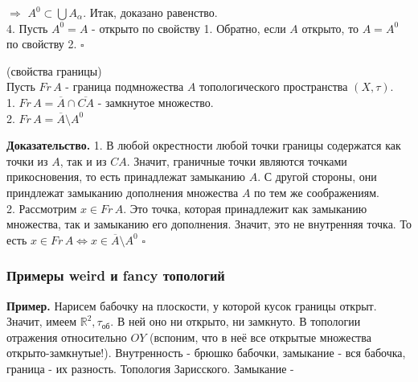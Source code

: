 $\Rightarrow$ $A^0\subset \bigcup A_\alpha$. Итак, доказано равенство.\\
4. Пусть $A^0=A$ - открыто по свойству 1. Обратно, если  $A$ открыто, то
 $A=A^0$ по свойству 2. 
$\square$ 
\begin{theor}
    (свойства границы)\\
Пусть $Fr\, A$ - граница подмножества $A$ топологического пространства 
$(X,\tau)$.\\
1. $Fr\,A=\overline{A}\cap\overline{CA}$ - замкнутое множество.\\
2. $Fr\,A=\overline{A}\setminus A^0$
\end{theor}
\textbf{Доказательство.} 
1. В любой окрестности любой точки границы содержатся как точки из $A$, так
и из  $CA$. Значит, граничные точки являются точками прикосновения, то 
есть принадлежат замыканию  $A$. С другой стороны, они приндлежат
замыканию дополнения множества  $A$ по тем же соображениям.\\
2. Рассмотрим $x\in Fr\,A$. Это точка, которая принадлежит как замыканию
множества, так и замыканию его дополнения. Значит, это не внутренняя точка. 
То есть $x\in Fr\,A\iff x\in \overline{A}\setminus A^0$
$\square$ \\
\subsubsection{Примеры weird и fancy топологий}
\textbf{Пример.} Нарисем бабочку на плоскости, у которой кусок границы открыт.
Значит, имеем $\mathbb{R}^2,\tau_{\text{об}}$. В ней оно ни открыто, ни
замкнуто. В топологии отражения относительно $OY$ (вспоним, что в неё все
открытые множества открыто-замкнутые!). Внутренность - брюшко бабочки,
замыкание - вся бабочка, граница - их разность. 
Топология Зарисского. Замыкание -  $$



